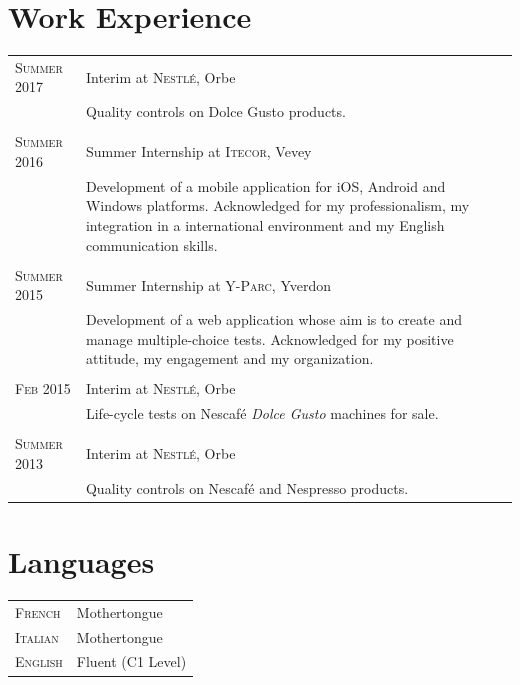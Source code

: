 \documentclass[a4paper,10pt]{article}
\begin{document}
\section{Work Experience}

\begin{tabular}{lp{12cm}}
    \textsc{Summer 2017}
    & Interim at \textsc{Nestlé}, Orbe \\
    & \footnotesize{Quality controls on Dolce Gusto products.} \\
    \\

    \textsc{Summer 2016}
    & Summer Internship at \textsc{Itecor}, Vevey \\
    \hspace*{2.3cm} & \footnotesize{Development of a mobile application for iOS, Android and Windows platforms. Acknowledged for my professionalism, my integration in a international environment and my English communication skills.} \\
    \\

    \textsc{Summer 2015}
    & Summer Internship at \textsc{Y-Parc}, Yverdon \\
    & \footnotesize{Development of a web application whose aim is to create and manage multiple-choice tests. Acknowledged for my positive attitude, my engagement and my organization.} \\
    \\

    \textsc{Feb 2015} & Interim at \textsc{Nestlé}, Orbe \\
    & \footnotesize{Life-cycle tests on Nescafé \textit{Dolce Gusto} machines for sale.} \\
    \\

    \textsc{Summer 2013} & Interim at \textsc{Nestlé}, Orbe \\
    & \footnotesize{Quality controls on Nescafé and Nespresso products.}
\end{tabular}

\section{Languages}

\begin{tabular}{p{2.3cm}l}
    \textsc{French}  & Mothertongue \\
    \textsc{Italian} & Mothertongue \\
    \textsc{English} & Fluent (C1 Level)\\
\end{tabular}
\end{document}

